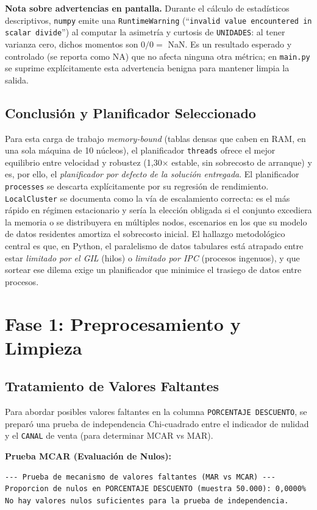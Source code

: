 \documentclass[12pt,letterpaper]{article}
\begin{document}
\noindent\textbf{Nota sobre advertencias en pantalla.} Durante el cálculo de estadísticos descriptivos,
\texttt{numpy} emite una \texttt{RuntimeWarning} (``\texttt{invalid value encountered in scalar divide}'')
al computar la asimetría y curtosis de \texttt{UNIDADES}: al tener varianza cero, dichos momentos son
$0/0 = $ NaN. Es un resultado esperado y controlado (se reporta como NA) que no afecta ninguna otra
métrica; en \texttt{main.py} se suprime explícitamente esta advertencia benigna para mantener limpia la
salida.

\subsection{Conclusión y Planificador Seleccionado}
Para esta carga de trabajo \textit{memory-bound} (tablas densas que caben en RAM, en una sola
máquina de 10 núcleos), el planificador \texttt{threads} ofrece el mejor equilibrio entre velocidad
y robustez (1,30$\times$ estable, sin sobrecosto de arranque) y es, por ello, el \textit{planificador
por defecto de la solución entregada}. El planificador \texttt{processes} se descarta explícitamente
por su regresión de rendimiento. \texttt{LocalCluster} se documenta como la vía de escalamiento
correcta: es el más rápido en régimen estacionario y sería la elección obligada si el conjunto
excediera la memoria o se distribuyera en múltiples nodos, escenarios en los que su modelo de datos
residentes amortiza el sobrecosto inicial. El hallazgo metodológico central es que, en Python, el
paralelismo de datos tabulares está atrapado entre estar \textit{limitado por el GIL} (hilos) o
\textit{limitado por IPC} (procesos ingenuos), y que sortear ese dilema exige un planificador que
minimice el trasiego de datos entre procesos.

\section{Fase 1: Preprocesamiento y Limpieza}
\subsection{Tratamiento de Valores Faltantes}
Para abordar posibles valores faltantes en la columna \texttt{PORCENTAJE DESCUENTO}, se preparó una prueba de independencia Chi-cuadrado entre el indicador de nulidad y el \texttt{CANAL} de venta (para determinar MCAR vs MAR). 

\vspace{0.4cm}
\noindent\textbf{Prueba MCAR (Evaluación de Nulos):}
\begin{verbatim}
--- Prueba de mecanismo de valores faltantes (MAR vs MCAR) ---
Proporcion de nulos en PORCENTAJE DESCUENTO (muestra 50.000): 0,0000%
No hay valores nulos suficientes para la prueba de independencia.
\end{verbatim}
\vspace{0.4cm}
\end{document}
